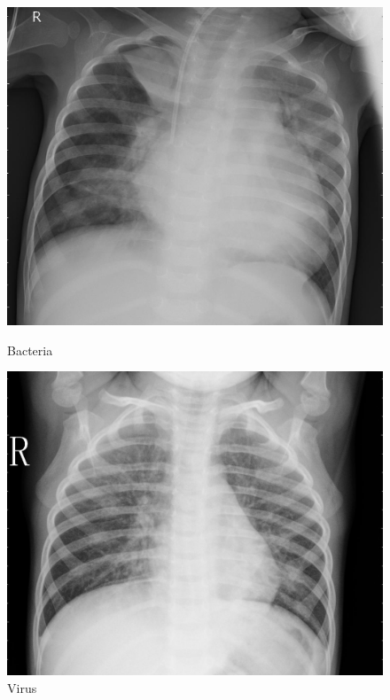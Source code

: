 \documentclass{article}
\begin{document}
\begin{figure}[!htb]
  \includegraphics[width=\linewidth]{assets/intro/scan-bacteria.jpeg}
  \caption{Bacteria}\label{fig:scan-bacteria}
\endminipage\hfill
{}
  \includegraphics[width=\linewidth]{assets/intro/scan-virus.jpeg}
  \caption{Virus}\label{fig:scan-virus}
\endminipage\hfill
{}%

\end{figure}
\end{document}

